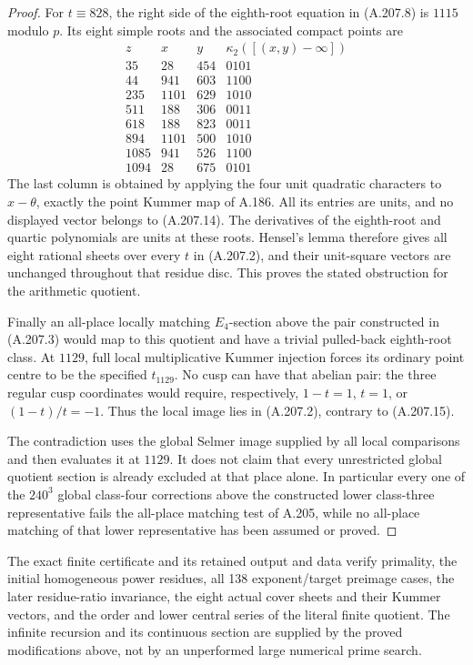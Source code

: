 \begin{proof}
For \(t\equiv828\), the right side of the eighth-root
equation in (A.207.8) is \(1115\) modulo \(p\).
Its eight simple roots and the associated compact points are
\[
\begin{array}{c|r|r|c}
 z&x&y&\kappa_2([(x,y)-\infty])\\\hline
 35&28&454&0101\\
 44&941&603&1100\\
 235&1101&629&1010\\
 511&188&306&0011\\
 618&188&823&0011\\
 894&1101&500&1010\\
 1085&941&526&1100\\
 1094&28&675&0101
\end{array}
\tag{A.207.15}
\]
The last column is obtained by applying the four unit
quadratic characters to \(x-\theta\), exactly the point
Kummer map of A.186.  All its entries are units, and no
displayed vector belongs to (A.207.14).
The derivatives of the eighth-root and quartic polynomials
are units at these roots.  Hensel's lemma therefore gives
all eight rational sheets over every \(t\) in (A.207.2),
and their unit-square vectors are unchanged throughout
that residue disc.  This proves the stated obstruction
for the arithmetic quotient.

Finally an all-place locally matching \(E_4\)-section
above the pair constructed in (A.207.3) would map to this
quotient and have a trivial pulled-back eighth-root class.
At \(1129\), full local multiplicative Kummer injection
forces its ordinary point centre to be the specified
\(t_{1129}\).  No cusp can have that abelian pair:
the three regular cusp coordinates would require,
respectively, \(1-t=1\), \(t=1\), or
\((1-t)/t=-1\).  Thus the local image lies in (A.207.2),
contrary to (A.207.15).

The contradiction uses the global Selmer image supplied by
all local comparisons and then evaluates it at \(1129\).
It does not claim that every unrestricted global quotient
section is already excluded at that place alone.
In particular every one of the \(240^3\) global
class-four corrections above the constructed lower
class-three representative fails the all-place matching
test of A.205, while no all-place matching of that lower
representative has been assumed or proved.
\end{proof}

The exact finite certificate
 and its
retained output and data verify primality, the initial
homogeneous power residues, all 138 exponent/target
preimage cases, the later residue-ratio invariance,
the eight actual cover sheets and their Kummer vectors,
and the order and lower central series of the literal
finite quotient.  The infinite recursion and its
continuous section are supplied by the proved modifications
above, not by an unperformed large numerical prime search.
